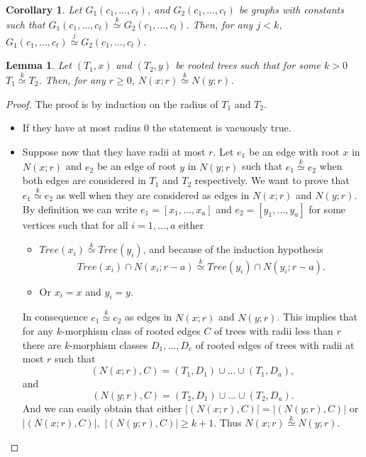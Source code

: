 \documentclass[11pt,notitlepage]{report}
\newtheorem{lemma}{Lemma}[chapter]
\newtheorem{corollary}{Corollary}[chapter]
\theoremstyle{definition}
\newcommand{\morph}[1]{\stackrel{#1}{\simeq}}
\begin{document}
\begin{corollary}
	Let $G_1(c_1,\dots, c_t)$, and $G_2(c_1,\dots,c_t)$ be graphs
	with constants such that $G_1(c_1,\dots, c_t)\morph{k}G_2(c_1,\dots,c_t)$.
	Then, for any $j<k$, $G_1(c_1,\dots, c_t)\morph{j}G_2(c_1,\dots,c_t)$.
\end{corollary}



\begin{lemma}
	Let $(T_1,x)$ and $(T_2,y)$ be rooted trees such that for some $k>0$ 
	$T_1 \morph{k} T_2$. Then, for any $r\geq 0$, $N(x;r)\morph{k} N(y;r)$.
\end{lemma}
\begin{proof}
	The proof is by induction on the radius of $T_1$ and $T_2$.
	\begin{itemize}
		\item If they have at most radius $0$ the statement is vacuously true. 
		\item Suppose now that they have radii at most $r$. Let $e_1$ be an edge with root
		$x$ in $N(x;r)$ and $e_2$ be an edge of root $y$ in $N(y;r)$ such that $e_1 \morph{k} e_2$
		when both edges are considered in $T_1$ and $T_2$ respectively. We want to prove that
		$e_1 \morph{k} e_2$ as well when they are considered as edges in $N(x;r)$ and $N(y;r)$.
		By definition we can write $e_1=[x_1,\dots,x_a]$ and 
		$e_2=[y_1,\dots,y_a]$ for some vertices such that for all
		$i=1,\dots, a$ either 
		\begin{itemize}
			\item $Tree(x_i)\morph{k} Tree(y_i)$, and because of the induction hypothesis 
			\[Tree(x_i)\cap N(x_i;r-a) \morph{k} Tree(y_i)\cap N(y_i;r-a).\] 
			\item Or $x_i=x$ and $y_i=y$.
		\end{itemize}
		In consequence $e_1 \morph{k} e_2$ as edges in $N(x;r)$ and $N(y;r)$. 
		This implies that for any $k$-morphism class of rooted edges $C$ of trees with
		radii less than $r$ there are $k$-morphism classes $D_1,\dots,D_c$ of rooted edges
		of trees with radii at most $r$ such that
		\[ (N(x;r),C) = (T_1, D_1)\cup \dots \cup (T_1,D_a), \]
		and 
		\[(N(y;r),C) = (T_2, D_1)\cup \dots \cup (T_2,D_a).\]
		And we can easily obtain that either
		$|(N(x;r),C)|=|(N(y;r),C)|$ or $|(N(x;r),C)|,$ $
		|(N(y;r),C)|\geq k+1$. 	Thus $N(x;r)\morph{k} N(y;r)$.
	\end{itemize}	
\end{proof}
\end{document}
